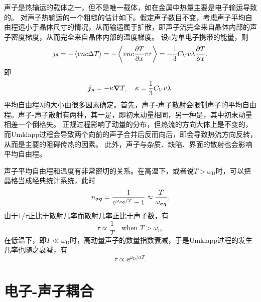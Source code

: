 声子是热输运的载体之一，但不是唯一载体，如在金属中热量主要是电子输运导致的。
对声子热输运的一个粗糙的估计如下。假定声子数目不变，考虑声子平均自由程远小于晶体尺寸的情况，从而输运属于扩散，即声子流完全来自晶体内部的声子密度梯度，从而完全来自晶体内部的温度梯度。
设$c$为单电子携带的能量，则
\[
    j_\theta = - \expval*{v n c \Delta T} = - \expval{v n c \pdv{T}{x} v \tau} = - \frac{1}{3} C_V v \lambda \pdv{T}{x},
\]
即
\begin{equation}
    \vb*{j}_\theta = -\kappa \grad{T}, \quad \kappa = \frac{1}{3} C_V v \lambda.
\end{equation}
平均自由程$\lambda$的大小由很多因素确定。首先，声子-声子散射会限制声子的平均自由程。声子-声子散射有两种，其一是，即初末动量相同，另一种是，其中初末动量相差一个倒格矢。
正规过程影响了动量的分布，但热流的方向大体上是不变的，而Umklapp过程会导致两个向前的声子合并后反而向后，即会导致热流方向反转，从而是主要的阻碍传热的因素。
此外，声子与杂质、缺陷、界面的散射也会影响平均自由程。

声子平均自由程和温度有非常密切的关系。在高温下，或者说$T > \omega_\text{D}$时，可以把晶格当成经典统计系统，此时
\begin{equation}
    n_{\sigma \vb*{q}} = \frac{1}{\mathrm{e}^{\omega_{\sigma \vb*{q}} / T} - 1} \approx \frac{T}{\omega_{\sigma \vb*{q}}},
\end{equation}
由于$1/ \tau$正比于散射几率而散射几率正比于声子数，有
\begin{equation}
    \tau \propto \frac{1}{T} \quad \text{when $T > \omega_\text{D}$}.
\end{equation}
在低温下，即$T \ll \omega_\text{D}$时，高动量声子的数量指数衰减，于是Umklapp过程的发生几率也随之衰减，有
\begin{equation}
    \tau \propto \ee^{\omega_\text{D} / \alpha T}.
\end{equation}

\section{电子-声子耦合}

